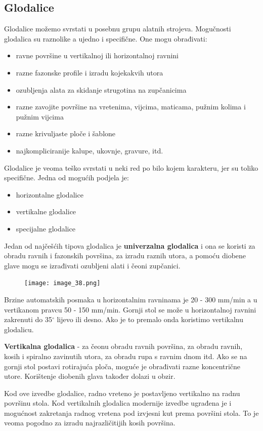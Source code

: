 \documentclass[a4paper,12pt]{article}
\numberwithin{figure}{section}
\begin{document}
\subsection{Glodalice}
Glodalice možemo svrstati u posebnu grupu alatnih strojeva. Mogučnosti glodalica su raznolike a ujedno i specifične. One mogu obrađivati:
\begin{itemize}
\item ravne površine u vertikalnoj ili horizontalnoj ravnini
\item razne fazonske profile i izradu kojekakvih utora
\item ozubljenja alata za skidanje strugotina na zupčanicima
\item razne zavojite površine na vretenima, vijcima, maticama, pužnim kolima i pužnim vijcima
\item razne krivuljaste ploče i šablone
\item najkompliciranije kalupe, ukovnje, gravure, itd.
\end{itemize}
Glodalice je veoma teško svrstati u neki red po bilo kojem karakteru, jer su toliko specifične. Jedna od mogućih podjela je:
\begin{itemize}
\item horizontalne glodalice
\item vertikalne glodalice
\item specijalne glodalice
\end{itemize}
Jedan od najčešćih tipova glodalica je \textbf{univerzalna glodalica} i ona se koristi za obradu ravnih i fazonskih površina, za izradu raznih utora, a pomoću diobene glave mogu se izrađivati ozubljeni alati i čeoni zupčanici.
\begin{figure}[!h]
\centering
\texttt{[image: image\_38.png]}
\end{figure}
\FloatBarrier
Brzine automatskih posmaka u horizontalnim ravninama je 20 - 300 mm/min a u vertikanom pravcu 50 - 150 mm/min. Gornji stol se može u horizontalnoj ravnini zakrenuti do 35$^{\circ}$ lijevo ili desno. Ako je to premalo onda koristimo vertikalnu glodalicu.\par
\textbf{Vertikalna glodalica} - za čeonu obradu ravnih površina, za obradu ravnih, kosih i spiralno zavinutih utora, za obradu rupa s ravnim dnom itd. Ako se na gornji stol postavi rotirajuća ploča, moguće je obrađivati razne koncentrične utore. Korištenje diobenih glava također dolazi u obzir.\par
Kod ove izvedbe glodalice, radno vreteno je postavljeno vertikalno na radnu površinu stola. Kod vertikalnih glodalica modernije izvedbe ugrađena je i mogućnost zakretanja radnog vretena pod izvjesni kut prema površini stola. To je veoma pogodno za izradu najrazličitijih kosih površina.\par
\end{document}
